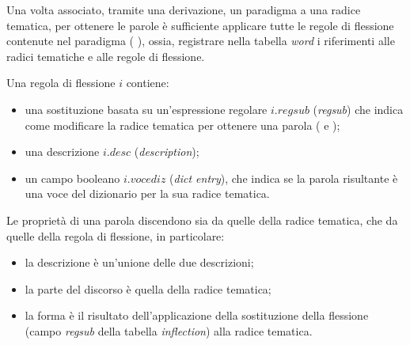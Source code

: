 \documentclass[twoside,stylearticle,11pt,filologia,it,article,bibsection]{spinoza}
\begin{document}
\label{sec:flessione}


Una volta associato, tramite una derivazione, un paradigma a una
radice tematica, per ottenere le parole è sufficiente applicare tutte
le regole di flessione contenute nel paradigma (\vedi
{}), ossia, registrare nella tabella {\it
  word} i riferimenti alle radici tematiche e alle regole di
flessione.

Una regola di flessione $i$ contiene:
\begin{itemize}
\item una sostituzione basata su un'espressione regolare $i.{regsub}$
  ({\it regsub}) che indica come modificare la radice tematica per
  ottenere una parola (\vedi {} e
  );
\item una descrizione $i.desc$ ({\it description});
\item un campo booleano $i.vocediz$ ({\it dict entry}), che indica se la
  parola risultante è una voce del dizionario per la sua radice
  tematica.
\end{itemize}

Le proprietà di una parola discendono sia da quelle della radice
tematica, che da quelle della regola di flessione, in particolare:
\begin{itemize}
\item la descrizione è un'unione delle due descrizioni;
\item la parte del discorso è quella della radice tematica;
\item la forma è il risultato dell'applicazione della sostituzione
  della flessione (campo {\it regsub} della tabella {\it inflection})
  alla radice tematica.
\end{itemize}
\end{document}
